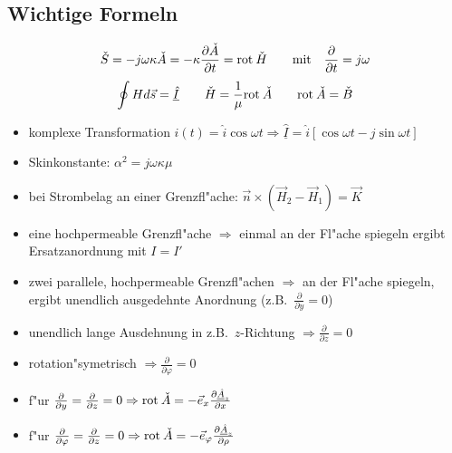 \subsection{Wichtige Formeln}

$$\check{S}=-j\omega\kappa\check{A}=-\kappa\frac{\partial\check{A}}{\partial t}=
{\rm rot \:} \check{H}\qquad {\rm mit} \quad\frac{\partial}{\partial t}=j\omega$$
$$\oint Hd\vec{s}=\underline{\hat{I}}\qquad\check{H}=\frac{1}{\mu}{\rm rot \:}\check{A}
\qquad {\rm rot \:}\check{A}=\check{B}$$

\begin{itemize}
\item komplexe Transformation $i(t)=\hat{i}\cos\omega t \Rightarrow
      \underline{\hat{I}}=\hat{i}\left[\cos\omega t - j\sin\omega t\right]$
\item Skinkonstante: $\alpha^2=j\omega\kappa\mu $
\item bei Strombelag an einer Grenzfl"ache:
      $\vec{n}\times(\vec{H}_2-\vec{H}_1)=\vec{K}$
\item eine hochpermeable Grenzfl"ache $\Rightarrow$ einmal an der Fl"ache spiegeln
      ergibt Ersatzanordnung mit $I=I'$
\item zwei parallele, hochpermeable Grenzfl"achen $\Rightarrow$ an der Fl"ache
      spiegeln, ergibt
      unendlich ausgedehnte Anordnung (z.B.\ $\frac{\partial}{\partial y}=0$)
\item unendlich lange Ausdehnung in z.B.\ $z$-Richtung $\Rightarrow
      \frac{\partial}{\partial z}=0$
\item rotation"symetrisch $\Rightarrow \frac{\partial}{\partial \varphi}=0$
\item f"ur $\frac{\partial}{\partial y}=\frac{\partial}{\partial z}=0 \Rightarrow
      {\rm rot \:}\check{A}=-\vec{e}_x\frac{\partial \underline{\hat{A}}_z}{\partial x}$
\item f"ur $\frac{\partial}{\partial \varphi}=\frac{\partial}{\partial z}=0 \Rightarrow
      {\rm rot \:}\check{A}=-\vec{e}_{\varphi}\frac{\partial\underline{\hat{A}}_z}{\partial\rho}$
\end{itemize}
\clearpage
